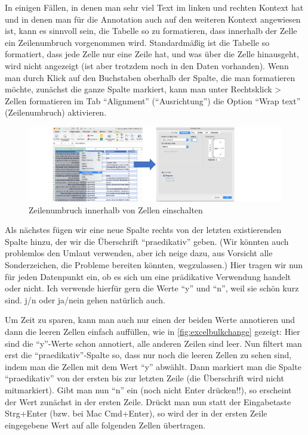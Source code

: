 \documentclass[]{article}
\begin{document}
In einigen Fällen, in denen man sehr viel Text im linken und rechten
Kontext hat und in denen man für die Annotation auch auf den weiteren
Kontext angewiesen ist, kann es sinnvoll sein, die Tabelle so zu
formatieren, dass innerhalb der Zelle ein Zeilenumbruch vorgenommen
wird. Standardmäßig ist die Tabelle so formatiert, dass jede Zelle nur
eine Zeile hat, und was über die Zelle hinausgeht, wird nicht angezeigt
(ist aber trotzdem noch in den Daten vorhanden). Wenn man durch Klick
auf den Buchstaben oberhalb der Spalte, die man formatieren möchte,
zunächst die ganze Spalte markiert, kann man unter Rechtsklick
\textgreater{} Zellen formatieren im Tab \enquote{Alignment}
(\enquote{Ausrichtung}) die Option \enquote{Wrap text} (Zeilenumbruch)
aktivieren.

\begin{figure}
\includegraphics[width=6.66in]{docs/fig/excellinewrap} \caption{Zeilenumbruch innerhalb von Zellen einschalten}\label{fig:excelwrap}
\end{figure}

Als nächstes fügen wir eine neue Spalte rechts von der letzten
existierenden Spalte hinzu, der wir die Überschrift
\enquote{praedikativ} geben. (Wir könnten auch problemlos den Umlaut
verwenden, aber ich neige dazu, aus Vorsicht alle Sonderzeichen, die
Probleme bereiten könnten, wegzulassen.) Hier tragen wir nun für jeden
Datenpunkt ein, ob es sich um eine prädikative Verwendung handelt oder
nicht. Ich verwende hierfür gern die Werte \enquote{y} und \enquote{n},
weil sie schön kurz sind. j/n oder ja/nein gehen natürlich auch.

Um Zeit zu sparen, kann man auch nur einen der beiden Werte annotieren
und dann die leeren Zellen einfach auffüllen, wie in
\ref{fig:excelbulkchange} gezeigt: Hier sind die \enquote{y}-Werte schon
annotiert, alle anderen Zeilen sind leer. Nun filtert man erst die
\enquote{praedikativ}-Spalte so, dass nur noch die leeren Zellen zu
sehen sind, indem man die Zellen mit dem Wert \enquote{y} abwählt. Dann
markiert man die Spalte \enquote{praedikativ} von der ersten bis zur
letzten Zeile (die Überschrift wird nicht mitmarkiert). Gibt man nun
\enquote{n} ein (noch nicht Enter drücken!!), so erscheint der Wert
zunächst in der ersten Zeile. Drückt man nun statt der Eingabetaste
Strg+Enter (bzw. bei Mac Cmd+Enter), so wird der in der ersten Zeile
eingegebene Wert auf alle folgenden Zellen übertragen.
\end{document}
